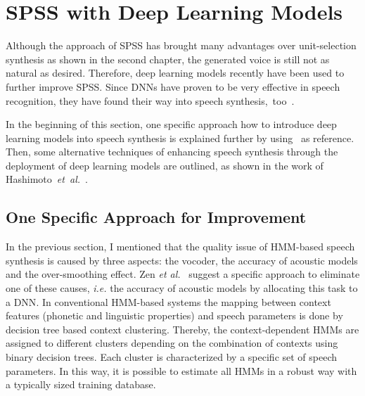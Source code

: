 \section{\ac{SPSS} with Deep Learning Models}
\label{sec:deepspeech}

Although the approach of \ac{SPSS} has brought many advantages over unit-selection synthesis as shown in the second chapter, the generated voice is still not as natural as desired. Therefore, deep learning models recently have been used to further improve \ac{SPSS}. Since \acfp{DNN} have proven to be very effective in speech recognition, they have found their way into speech synthesis,~too~\cite{hashimoto:effect}. %

In the beginning of this section, one specific approach how to introduce deep learning models into speech synthesis is explained further by using~\cite{zen:deepstatistical} as reference. Then, some alternative techniques of enhancing speech synthesis through the deployment of deep learning models are outlined, as shown in the work of Hashimoto~\textit{et~al.}~\cite{hashimoto:effect}.


\subsection{One Specific Approach for Improvement}
\label{subsec:deepspss}

In the previous section, I mentioned that the quality issue of \ac{HMM}-based speech synthesis is caused by three aspects: the vocoder, the accuracy of acoustic models and the over-smoothing effect. Zen \textit{et al.}~\cite{zen:deepstatistical} suggest a specific approach to eliminate one of these causes, \textit{i.e.} the accuracy of acoustic models by allocating this task to a \ac{DNN}. In conventional \ac{HMM}-based systems the mapping between context features (phonetic and linguistic properties) and speech parameters is done by decision tree based context clustering. Thereby, the context-dependent \acp{HMM} are assigned to different clusters depending on the combination of contexts using binary decision trees. Each cluster is characterized by a specific set of speech parameters. In this way, it is possible to estimate all \acp{HMM} in a robust way with a typically sized training database.

